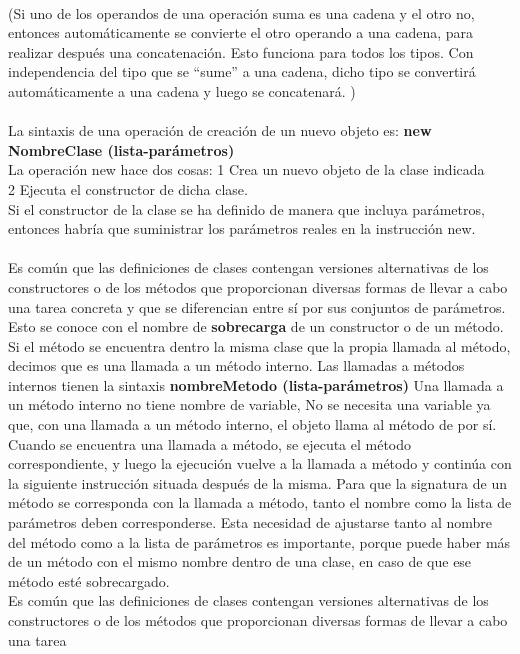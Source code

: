 \documentclass[11pt,a4paper]{article}
\begin{document}
	\\
	(Si uno de los operandos de una operación suma es una cadena y el otro no, entonces automáticamente
	se convierte el otro operando a una cadena, para realizar después una concatenación. Esto funciona para todos los tipos. Con independencia del tipo que se “sume” a una cadena, dicho
	tipo se convertirá automáticamente a una cadena y luego se concatenará. )\\
	\\
	La sintaxis de una operación de creación de un nuevo objeto es: \textbf{new NombreClase (lista-parámetros)}\\
	La operación new hace dos cosas:
	1 Crea un nuevo objeto de la clase indicada\\
	2 Ejecuta el constructor de dicha clase.\\
	Si el constructor de la clase se ha definido de manera que incluya parámetros, entonces habría que
	suministrar los parámetros reales en la instrucción new.\\
	\\
	Es común que las definiciones de clases contengan versiones alternativas de
	los constructores o de los métodos que proporcionan diversas formas de llevar a cabo una tarea
	concreta y que se diferencian entre sí por sus conjuntos de parámetros. Esto se conoce con el nombre
	de \textbf{sobrecarga} de un constructor o de un método.\\
	Si el método se
	encuentra dentro la misma clase que la propia llamada al método, decimos que es una llamada a
	un método interno. Las llamadas a métodos internos tienen la sintaxis
	\textbf{nombreMetodo (lista-parámetros)
	} Una llamada a un método interno no tiene nombre de variable, No se necesita una variable ya que, con una llamada a un método interno, el objeto llama
	al método de por sí.\\
	Cuando se encuentra una llamada a método, se ejecuta el método correspondiente, y luego la ejecución
	vuelve a la llamada a método y continúa con la siguiente instrucción situada después de
	la misma. Para que la signatura de un método se corresponda con la llamada a método, tanto el
	nombre como la lista de parámetros deben corresponderse. Esta necesidad de ajustarse tanto al nombre del método como a
	la lista de parámetros es importante, porque puede haber más de un método con el mismo nombre
	dentro de una clase, en caso de que ese método esté sobrecargado.\\
	Es común que las definiciones de clases contengan versiones alternativas de
	los constructores o de los métodos que proporcionan diversas formas de llevar a cabo una tarea
\end{document}
